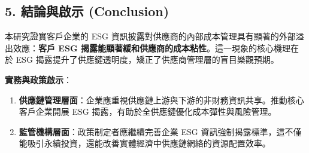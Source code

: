 \documentclass[11pt,a4paper]{article}
\begin{document}
\subsection{5. 結論與啟示 (Conclusion)}
本研究證實客戶企業的 ESG 資訊披露對供應商的內部成本管理具有顯著的外部溢出效應：\textbf{客戶 ESG 揭露能顯著緩和供應商的成本粘性}。這一現象的核心機理在於 ESG 揭露提升了供應鏈透明度，矯正了供應商管理層的盲目樂觀預期。

\textbf{實務與政策啟示}：
\begin{enumerate}[leftmargin=2em]
    \item \textbf{供應鏈管理層面}：企業應重視供應鏈上游與下游的非財務資訊共享。推動核心客戶企業開展 ESG 揭露，有助於全供應鏈優化成本彈性與風險管理。
    \item \textbf{監管機構層面}：政策制定者應繼續完善企業 ESG 資訊強制揭露標準，這不僅能吸引永續投資，還能改善實體經濟中供應鏈網絡的資源配置效率。
\end{enumerate}
\end{document}
